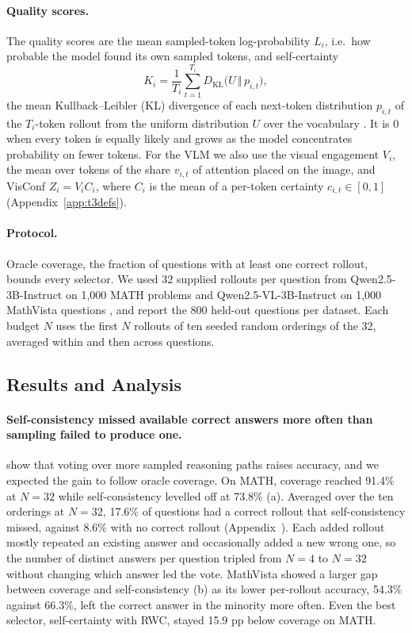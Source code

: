\documentclass{article}
\begin{document}
\paragraph{Quality scores.} The quality scores are the mean sampled-token log-probability $L_i$, i.e.\ how probable the model found its own sampled tokens, and self-certainty
\begin{equation*}
K_i=\frac1{T_i}\sum_{t=1}^{T_i}D_{\mathrm{KL}}\big(U\,\Vert\,p_{i,t}\big),
\end{equation*}
the mean Kullback--Leibler (KL) divergence of each next-token distribution $p_{i,t}$ of the $T_i$-token rollout from the uniform distribution $U$ over the vocabulary \citep{selfcertainty}. It is 0 when every token is equally likely and grows as the model concentrates probability on fewer tokens. For the VLM we also use the visual engagement $V_i$, the mean over tokens of the share $v_{i,t}$ of attention placed on the image, and VisConf $Z_i=V_iC_i$, where $C_i$ is the mean of a per-token certainty $c_{i,t}\in[0,1]$ \citep{visconf} (Appendix~\ref{app:t3defs}).

\paragraph{Protocol.} Oracle coverage, the fraction of questions with at least one correct rollout, bounds every selector. We used 32 supplied rollouts per question from Qwen2.5-3B-Instruct \citep{qwen25} on 1,000 MATH problems \citep{math} and Qwen2.5-VL-3B-Instruct on 1,000 MathVista questions \citep{mathvista}, and report the 800 held-out questions per dataset. Each budget $N$ uses the first $N$ rollouts of ten seeded random orderings of the 32, averaged within and then across questions.

\subsection{Results and Analysis}
\paragraph{Self-consistency missed available correct answers more often than sampling failed to produce one.}
\citet{selfconsistency} show that voting over more sampled reasoning paths raises accuracy, and we expected the gain to follow oracle coverage. On MATH, coverage reached 91.4\% at $N=32$ while self-consistency levelled off at 73.8\% (a). Averaged over the ten orderings at $N=32$, 17.6\% of questions had a correct rollout that self-consistency missed, against 8.6\% with no correct rollout (Appendix~). Each added rollout mostly repeated an existing answer and occasionally added a new wrong one, so the number of distinct answers per question tripled from $N=4$ to $N=32$ without changing which answer led the vote. MathVista showed a larger gap between coverage and self-consistency (b) as its lower per-rollout accuracy, 54.3\% against 66.3\%, left the correct answer in the minority more often. Even the best selector, self-certainty with RWC, stayed 15.9 pp below coverage on MATH.
\end{document}
